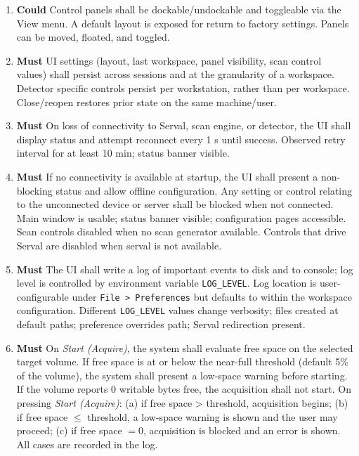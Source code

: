 \documentclass[12pt]{article}
\newcommand{\PriorityTag}[2]{%
  \colorbox{#2!25}{\footnotesize\textsf{\textbf{#1}}}\hspace{0.6em}}
\newcommand{\must}{\leavevmode\PriorityTag{Must}{green}}
\newcommand{\could}{\leavevmode\PriorityTag{Could}{cyan}}
\newcounter{reqgrp}[section] %
\newcounter{reqno}
\newcommand{\reqprefix}{GEN}
\newenvironment{requirements}[1]{%
  \renewcommand{\reqprefix}{#1}%
  \refstepcounter{reqgrp}%
  \setcounter{reqno}{0}%
  \begin{enumerate}[leftmargin=*]
}{\end{enumerate}}
\begin{document}
\begin{requirements}{UI}
\item \could {}
  {Control panels shall be dockable/undockable and toggleable via the View menu. A default layout is exposed for return to factory settings. }
  {Panels can be moved, floated, and toggled.}

\item \must {}
  {UI settings (layout, last workspace, panel visibility, scan control values) shall persist across sessions and at the granularity of a workspace. Detector specific controls persist per workstation, rather than per workspace.}
  {Close/reopen restores prior state on the same machine/user.}

\item \must {}
  {On loss of connectivity to Serval, scan engine, or detector, the UI shall display status and attempt reconnect every 1 s until success.}
  {Observed retry interval for at least 10 min; status banner visible.}

\item \must {}
  {If no connectivity is available at startup, the UI shall present a non-blocking status and allow offline configuration. Any setting or control relating to the unconnected device or server shall be blocked when not connected.}
  {Main window is usable; status banner visible; configuration pages accessible. Scan controls disabled when no scan generator available. Controls that drive Serval are disabled when serval is not available.}

\item \must {}
  {The UI shall write a log of important events to disk and to console; log level is controlled by environment variable \texttt{LOG\_LEVEL}. Log location is user-configurable under \texttt{File > Preferences} but defaults to within the workspace configuration.}
  {Different \texttt{LOG\_LEVEL} values change verbosity; files created at default paths; preference overrides path; Serval redirection present.}

\item \must {}
  {On \emph{Start (Acquire)}, the system shall evaluate free space on the selected target volume. If free space is at or below the near-full threshold (default 5\% of the volume), the system shall present a low-space warning before starting. If the volume reports 0 writable bytes free, the acquisition shall not start.}
  {On pressing \emph{Start (Acquire)}: (a) if free space > threshold, acquisition begins; (b) if free space \(\le\) threshold, a low-space warning is shown and the user may proceed; (c) if free space \(=0\), acquisition is blocked and an error is shown. All cases are recorded in the log.}


\end{requirements}
\end{document}
